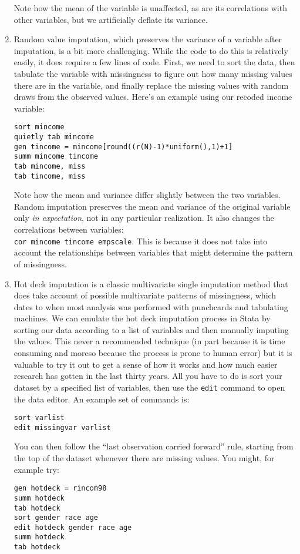 \documentclass[a4paper,12pt]{article}
\begin{document}
\begin{enumerate}
Note how the mean of the variable is unaffected, as are its correlations with other variables, but we artificially deflate its variance.

\item Random value imputation, which preserves the variance of a variable after imputation, is a bit more challenging. While the code to do this is relatively easily, it does require a few lines of code. First, we need to sort the data, then tabulate the variable with missingness to figure out how many missing values there are in the variable, and finally replace the missing values with random draws from the observed values. Here's an example using our recoded income variable:
\begin{verbatim}
sort mincome
quietly tab mincome
gen tincome = mincome[round((r(N)-1)*uniform(),1)+1]
summ mincome tincome
tab mincome, miss
tab tincome, miss
\end{verbatim}

Note how the mean and variance differ slightly between the two variables. Random imputation preserves the mean and variance of the original variable only {\em in expectation}, not in any particular realization. It also changes the correlations between variables:\\
\texttt{cor mincome tincome empscale}. This is because it does not take into account the relationships between variables that might determine the pattern of missingness.

\item Hot deck imputation is a classic multivariate single imputation method that does take account of possible multivariate patterns of missingness, which dates to when most analysis was performed with punchcards and tabulating machines. We can emulate the hot deck imputation process in Stata by sorting our data according to a list of variables and then manually imputing the values. This never a recommended technique (in part because it is time consuming and moreso because the process is prone to human error) but it is valuable to try it out to get a sense of how it works and how much easier research has gotten in the last thirty years. All you have to do is sort your dataset by a specified list of variables, then use the \texttt{edit} command to open the data editor. An example set of commands is:
\begin{verbatim}
sort varlist
edit missingvar varlist
\end{verbatim}

You can then follow the ``last observation carried forward'' rule, starting from the top of the dataset whenever there are missing values. You might, for example try:
\begin{verbatim}
gen hotdeck = rincom98
summ hotdeck
tab hotdeck
sort gender race age
edit hotdeck gender race age
summ hotdeck
tab hotdeck
\end{verbatim}


\end{enumerate}
\end{document}
